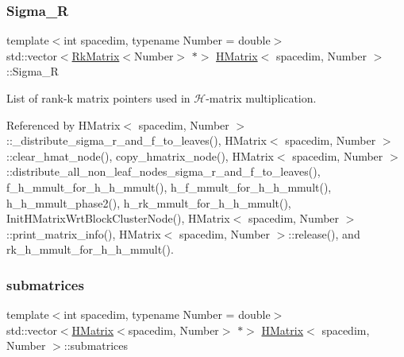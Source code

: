 \mbox{\label{classHMatrix_a04d341b4e606d1be2d71b8ea636efe7b}} 
\subsubsection{\texorpdfstring{Sigma\+\_\+R}{Sigma\_R}}
{\footnotesize\ttfamily template$<$int spacedim, typename Number = double$>$ \\
std\+::vector$<$\hyperlink{classRkMatrix}{Rk\+Matrix}$<$Number$>$ $\ast$$>$ \hyperlink{classHMatrix}{H\+Matrix}$<$ spacedim, Number $>$\+::Sigma\+\_\+R\hspace{0.3cm}{\ttfamily [private]}}

List of rank-\/k matrix pointers used in $\mathcal{H}$-\/matrix multiplication. 

Referenced by H\+Matrix$<$ spacedim, Number $>$\+::\+\_\+distribute\+\_\+sigma\+\_\+r\+\_\+and\+\_\+f\+\_\+to\+\_\+leaves(), H\+Matrix$<$ spacedim, Number $>$\+::clear\+\_\+hmat\+\_\+node(), copy\+\_\+hmatrix\+\_\+node(), H\+Matrix$<$ spacedim, Number $>$\+::distribute\+\_\+all\+\_\+non\+\_\+leaf\+\_\+nodes\+\_\+sigma\+\_\+r\+\_\+and\+\_\+f\+\_\+to\+\_\+leaves(), f\+\_\+h\+\_\+mmult\+\_\+for\+\_\+h\+\_\+h\+\_\+mmult(), h\+\_\+f\+\_\+mmult\+\_\+for\+\_\+h\+\_\+h\+\_\+mmult(), h\+\_\+h\+\_\+mmult\+\_\+phase2(), h\+\_\+rk\+\_\+mmult\+\_\+for\+\_\+h\+\_\+h\+\_\+mmult(), Init\+H\+Matrix\+Wrt\+Block\+Cluster\+Node(), H\+Matrix$<$ spacedim, Number $>$\+::print\+\_\+matrix\+\_\+info(), H\+Matrix$<$ spacedim, Number $>$\+::release(), and rk\+\_\+h\+\_\+mmult\+\_\+for\+\_\+h\+\_\+h\+\_\+mmult().

\mbox{\label{classHMatrix_a4bd1b9a32f2c7693e603a7c6ea916e4f}} 
\subsubsection{\texorpdfstring{submatrices}{submatrices}}
{\footnotesize\ttfamily template$<$int spacedim, typename Number = double$>$ \\
std\+::vector$<$\hyperlink{classHMatrix}{H\+Matrix}$<$spacedim, Number$>$ $\ast$$>$ \hyperlink{classHMatrix}{H\+Matrix}$<$ spacedim, Number $>$\+::submatrices\hspace{0.3cm}{\ttfamily [private]}}

